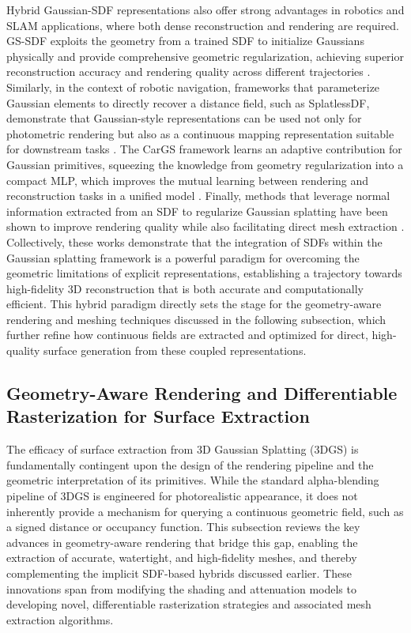 \documentclass[11pt]{article}
\begin{document}
Hybrid Gaussian-SDF representations also offer strong advantages in robotics and SLAM applications, where both dense reconstruction and rendering are required. GS-SDF exploits the geometry from a trained SDF to initialize Gaussians physically and provide comprehensive geometric regularization, achieving superior reconstruction accuracy and rendering quality across different trajectories \cite{ref207}. Similarly, in the context of robotic navigation, frameworks that parameterize Gaussian elements to directly recover a distance field, such as SplatlessDF, demonstrate that Gaussian-style representations can be used not only for photometric rendering but also as a continuous mapping representation suitable for downstream tasks \cite{ref208}. The CarGS framework learns an adaptive contribution for Gaussian primitives, squeezing the knowledge from geometry regularization into a compact MLP, which improves the mutual learning between rendering and reconstruction tasks in a unified model \cite{ref209}. Finally, methods that leverage normal information extracted from an SDF to regularize Gaussian splatting have been shown to improve rendering quality while also facilitating direct mesh extraction \cite{ref210}. Collectively, these works demonstrate that the integration of SDFs within the Gaussian splatting framework is a powerful paradigm for overcoming the geometric limitations of explicit representations, establishing a trajectory towards high-fidelity 3D reconstruction that is both accurate and computationally efficient. This hybrid paradigm directly sets the stage for the geometry-aware rendering and meshing techniques discussed in the following subsection, which further refine how continuous fields are extracted and optimized for direct, high-quality surface generation from these coupled representations.

\subsection{Geometry-Aware Rendering and Differentiable Rasterization for Surface Extraction}

The efficacy of surface extraction from 3D Gaussian Splatting (3DGS) is fundamentally contingent upon the design of the rendering pipeline and the geometric interpretation of its primitives. While the standard alpha-blending pipeline of 3DGS is engineered for photorealistic appearance, it does not inherently provide a mechanism for querying a continuous geometric field, such as a signed distance or occupancy function. This subsection reviews the key advances in geometry-aware rendering that bridge this gap, enabling the extraction of accurate, watertight, and high-fidelity meshes, and thereby complementing the implicit SDF-based hybrids discussed earlier. These innovations span from modifying the shading and attenuation models to developing novel, differentiable rasterization strategies and associated mesh extraction algorithms.
\end{document}
